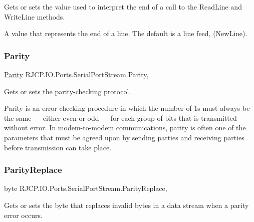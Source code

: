 Gets or sets the value used to interpret the end of a call to the Read\+Line and Write\+Line methods. 

A value that represents the end of a line. The default is a line feed, (New\+Line). \mbox{\label{class_r_j_c_p_1_1_i_o_1_1_ports_1_1_serial_port_stream_a944e2e00a494f4654d615eb1ac0ef52c}} 
\subsubsection{\texorpdfstring{Parity}{Parity}}
{\footnotesize\ttfamily \mbox{\hyperlink{namespace_r_j_c_p_1_1_i_o_1_1_ports_a35c8c760a80dd0392e605dd3ad169954}{Parity}} R\+J\+C\+P.\+I\+O.\+Ports.\+Serial\+Port\+Stream.\+Parity\hspace{0.3cm}{\ttfamily [get]}, {\ttfamily [set]}}



Gets or sets the parity-\/checking protocol. 

Parity is an error-\/checking procedure in which the number of 1s must always be the same — either even or odd — for each group of bits that is transmitted without error. In modem-\/to-\/modem communications, parity is often one of the parameters that must be agreed upon by sending parties and receiving parties before transmission can take place. \mbox{\label{class_r_j_c_p_1_1_i_o_1_1_ports_1_1_serial_port_stream_a15801195ab593913790ce5eacfd74785}} 
\subsubsection{\texorpdfstring{ParityReplace}{ParityReplace}}
{\footnotesize\ttfamily byte R\+J\+C\+P.\+I\+O.\+Ports.\+Serial\+Port\+Stream.\+Parity\+Replace\hspace{0.3cm}{\ttfamily [get]}, {\ttfamily [set]}}



Gets or sets the byte that replaces invalid bytes in a data stream when a parity error occurs. 

